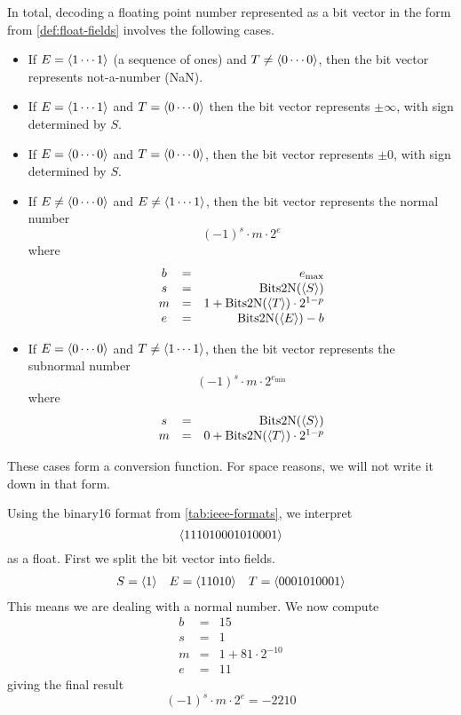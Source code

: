 In total, decoding a floating point number represented as a bit vector
in the form from \cref{def:float-fields} involves the following cases.

\begin{itemize}
\item If $E = \langle 1\cdots{} 1 \rangle$ (a sequence of ones) and
  $T \neq \langle 0\cdots{} 0 \rangle$, then the bit vector represents
  not-a-number (NaN).
\item If $E = \langle 1\cdots{} 1 \rangle$ and
  $T = \langle 0\cdots{} 0 \rangle$ then the bit vector represents
  $\pm\infty$, with sign determined by $S$.
\item If $E = \langle 0\cdots{} 0 \rangle$ and
  $T = \langle 0\cdots{} 0 \rangle$, then the bit vector represents
  $\pm 0$, with sign determined by $S$.
\item If $E \neq \langle 0\cdots{} 0 \rangle$ and
  $E \neq \langle 1\cdots{} 1 \rangle$, then the bit vector represents the
  normal number
  \[
    (-1)^{s} \cdot m \cdot 2^e
  \]
  where
  \[
    \begin{array}{ccr}
      b &=& e_{\text{max}} \\
      s &=& \mathrm{Bits2N}(\langle S \rangle) \\
      m &=& 1+\mathrm{Bits2N}(\langle T \rangle) \cdot{} 2^{1-p} \\
      e &=& \mathrm{Bits2N}(\langle E \rangle) - b
    \end{array}
  \]
\item If $E = \langle 0\cdots{} 0 \rangle$ and
  $T \neq \langle 1\cdots{} 1 \rangle$, then the bit vector represents the
  subnormal number
  \[
    (-1)^{s} \cdot m \cdot 2^{e_{\text{min}}}
  \]
  where
  \[
    \begin{array}{ccr}
      s &=& \mathrm{Bits2N}(\langle S \rangle) \\
      m &=& 0+\mathrm{Bits2N}(\langle T \rangle) \cdot{} 2^{1-p} \\
    \end{array}
  \]
\end{itemize}

These cases form a conversion function.  For space reasons, we will
not write it down in that form.

\begin{example}
  Using the binary16 format from \cref{tab:ieee-formats}, we interpret
  \[
    \langle 111010001010001 \rangle
  \]
  as a float.  First we split the bit vector into fields.
  \[
    \begin{array}{lll}
      S=\langle 1 \rangle & E=\langle 11010 \rangle & T=\langle 0001010001 \rangle
    \end{array}
  \]
  This means we are dealing with a normal number.  We now compute
  \[
    \begin{array}{ccr}
      b &=& 15 \\
      s &=& 1 \\
      m &=& 1 + 81 \cdot 2^{-10} \\
      e &=& 11
    \end{array}
  \]
  giving the final result
  \[
    (-1)^{s} \cdot m \cdot 2^{e} = -2210
  \]
\end{example}

